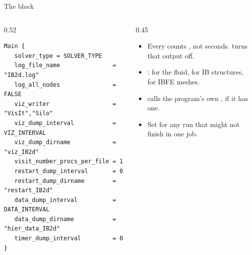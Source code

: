 \documentclass[aspectratio=169,11pt]{beamer}
\begin{document}
\begin{frame}[fragile]{The  block}
\begin{columns}[T,onlytextwidth]
\begin{column}{0.52\textwidth}
\begin{lstlisting}
Main {
   solver_type = SOLVER_TYPE
   log_file_name               = "IB2d.log"
   log_all_nodes               = FALSE
   viz_writer                  = "VisIt","Silo"
   viz_dump_interval           = VIZ_INTERVAL
   viz_dump_dirname            = "viz_IB2d"
   visit_number_procs_per_file = 1
   restart_dump_interval       = 0
   restart_dump_dirname        = "restart_IB2d"
   data_dump_interval          = DATA_INTERVAL
   data_dump_dirname           = "hier_data_IB2d"
   timer_dump_interval         = 0
}
\end{lstlisting}
\end{column}
\begin{column}{0.45\textwidth}
\begin{itemize}\small
  \item Every  counts , not seconds.  turns that output off.
  \item {}:  for the fluid,  for IB structures,  for IBFE meshes.
  \item {} calls the program's own , if it has one.
  \item Set  for any run that might not finish in one job.
\end{itemize}
\end{column}
\end{columns}
\end{frame}
\end{document}
